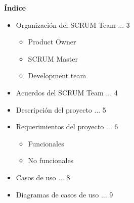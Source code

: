 \documentclass[12pt,letterpaper]{article}
\begin{document}
	\newpage
	\pagestyle{plain}
	{
		\begin{center}
			\par\vspace{0.5cm}
			{
				\Huge\textbf
				{
					\'Indice
				}
			}
		\end{center}
					\begin{itemize}
						\item Organización del SCRUM Team ... 3
                        \begin{itemize}
                            \item Product Owner
                            \item SCRUM Master
                            \item Development team
                        \end{itemize}
						\item Acuerdos del SCRUM Team ... 4
						\item Descripción del proyecto ... 5
						\item Requerimientos del proyecto ... 6
                            \begin{itemize}
                                \item Funcionales
                                \item No funcionales
                            \end{itemize}
                        \item Casos de uso ... 8
                        \item Diagramas de casos de uso ... 9
					\end{itemize}
			\vfill
	}
	\newpage
	\pagestyle{plain}
\end{document}
